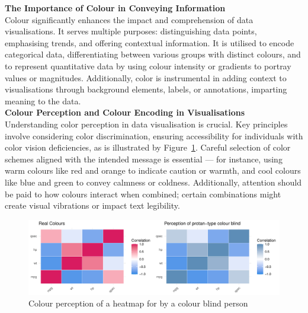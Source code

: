 \documentclass{article}\usepackage[]{graphicx}\usepackage[]{xcolor}
\makeatletter
\def\maxwidth{ %
  \ifdim\Gin@nat@width>\linewidth
    \linewidth
  \else
    \Gin@nat@width
  \fi
}
\newenvironment{knitrout}{}{} %
\makeatother
\begin{document}
\noindent \textbf{The Importance of Colour in Conveying Information}\\
Colour significantly enhances the impact and comprehension of data visualisations. It serves multiple purposes: distinguishing data points, emphasising trends, and offering contextual information. It is utilised to encode categorical data, differentiating between various groups with distinct colours, and to represent quantitative data by using colour intensity or gradients to portray values or magnitudes. Additionally, color is instrumental in adding context to visualisations through background elements, labels, or annotations, imparting meaning to the data.\\

\noindent \textbf{Colour Perception and Colour Encoding in Visualisations}\\
Understanding color perception in data visualisation is crucial. Key principles involve considering color discrimination, ensuring accessibility for individuals with color vision deficiencies, as is illustrated by Figure~\ref{fig:colour-plot}. Careful selection of color schemes aligned with the intended message is essential — for instance, using warm colours like red and orange to indicate caution or warmth, and cool colours like blue and green to convey calmness or coldness. Additionally, attention should be paid to how colours interact when combined; certain combinations might create visual vibrations or impact text legibility.\\

\begin{knitrout}\scriptsize
{}\color{fgcolor}\begin{figure}[H]

{\centering \includegraphics[width=\maxwidth]{figure/beamer-colour-plot-1} 

}

\caption[Colour perception of a heatmap for by a colour blind person]{Colour perception of a heatmap for by a colour blind person}\label{fig:colour-plot}
\end{figure}

\end{knitrout}
\end{document}
